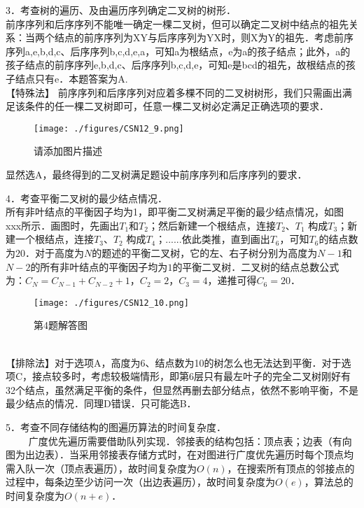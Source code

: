 3．考查树的遍历、及由遍历序列确定二叉树的树形．\\
前序序列和后序序列不能唯一确定一棵二叉树，但可以确定二叉树中结点的祖先关系：当两个结点的前序序列为XY与后序序列为YX时，则X为Y的祖先．考虑前序序列a,e,b,d,c、后序序列b,c,d,e,a，可知a为根结点，e为a的孩子结点；此外，a的孩子结点的前序序列e,b,d,c、后序序列b,c,d,e，可知e是bcd的祖先，故根结点的孩子结点只有e．本题答案为A. \\
【特殊法】 前序序列和后序序列对应着多棵不同的二叉树树形，我们只需画出满足该条件的任一棵二叉树即可，任意一棵二叉树必定满足正确选项的要求．
\begin{figure}[ht]
\centering
\texttt{[image: ./figures/CSN12\_9.png]}
\caption{请添加图片描述} \label{CSN12_fig9}
\end{figure}
显然选A，最终得到的二叉树满足题设中前序序列和后序序列的要求．

4．考查平衡二叉树的最少结点情况．\\
所有非叶结点的平衡因子均为1，即平衡二叉树满足平衡的最少结点情况，如图xxx所示．画图时，先画出$T_1$和$T_2$；然后新建一个根结点，连接$T_2$、$T_1$ 构成$T_3$；新建一个根结点，连接$T_3$、$T_2$ 构成$T_4$；......依此类推，直到画出$T_6$，可知$T_6$的结点数为$20$．对于高度为$N$的题述的平衡二叉树，它的左、右子树分别为高度为$N-1$和$N-2$的所有非叶结点的平衡因子均为$1$的平衡二叉树．二叉树的结点总数公式为：$C_N=C_{N-1}+C_{N-2}+1$，$C_2=2$，$C_3=4$，递推可得$C_6=20$．
\begin{figure}[ht]
\centering
\texttt{[image: ./figures/CSN12\_10.png]}
\caption{第4题解答图} \label{CSN12_fig10}
\end{figure} \\
【排除法】对于选项A，高度为6、结点数为10的树怎么也无法达到平衡．对于选项C，接点较多时，考虑较极端情形，即第6层只有最左叶子的完全二叉树刚好有32个结点，虽然满足平衡的条件，但显然再删去部分结点，依然不影响平衡，不是最少结点的情况．同理D错误．只可能选B．

5．考查不同存储结构的图遍历算法的时间复杂度．\\
$\qquad$ 广度优先遍历需要借助队列实现．邻接表的结构包括：顶点表；边表（有向图为出边表）．当采用邻接表存储方式时，在对图进行广度优先遍历时每个顶点均需入队一次（顶点表遍历），故时间复杂度为$O(n)$，在搜索所有顶点的邻接点的过程中，每条边至少访问一次（出边表遍历），故时间复杂度为$O(e)$，算法总的时间复杂度为$O(n+e)$．

